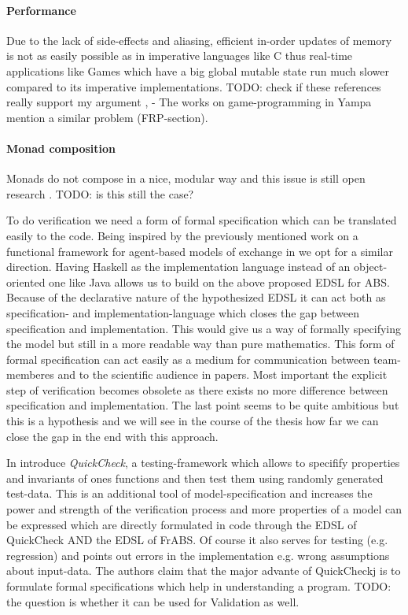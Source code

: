 \paragraph{Performance}
Due to the lack of side-effects and aliasing, efficient in-order updates of memory is not as easily possible as in imperative languages like C thus real-time applications like Games which have a big global mutable state run much slower compared to its imperative implementations.
TODO: check if these references really support my argument \cite{mun_hon_functional_2005}, \cite{meisinger_game-engine-architektur_2010} - The works on game-programming in Yampa mention a similar problem (FRP-section).

\paragraph{Monad composition}
Monads do not compose in a nice, modular way and this issue is still open research \cite{hudak_history_2007}. TODO: is this still the case?

To do verification we need a form of formal specification which can be translated easily to the code. Being inspired by the previously mentioned work on a functional framework for agent-based models of exchange in \cite{botta_functional_2011} we opt for a similar direction. Having Haskell as the implementation language instead of an object-oriented one like Java allows us to build on the above proposed EDSL for ABS. Because of the declarative nature of the hypothesized EDSL it can act both as specification- and implementation-language which closes the gap between specification and implementation. This would give us a way of formally specifying the model but still in a more readable way than pure mathematics. This form of formal specification can act easily as a medium for communication between team-memberes and to the scientific audience in papers. Most important the explicit step of verification becomes obsolete as there exists no more difference between specification and implementation. The last point seems to be quite ambitious but this is a hypothesis and we will see in the course of the thesis how far we can close the gap in the end with this approach.

In \cite{claessen_quickcheck:_2000} introduce \textit{QuickCheck}, a testing-framework which allows to specifify properties and invariants of ones functions and then test them using randomly generated test-data. This is an additional tool of model-specification and increases the power and strength of the verification process and more properties of a model can be expressed which are directly formulated in code through the EDSL of QuickCheck AND the EDSL of FrABS. Of course it also serves for testing (e.g. regression) and points out errors in the implementation e.g. wrong assumptions about input-data. The authors claim that the major advante of QuickCheckj is to formulate formal specifications which help in understanding a program.
TODO: the question is whether it can be used for Validation as well.



